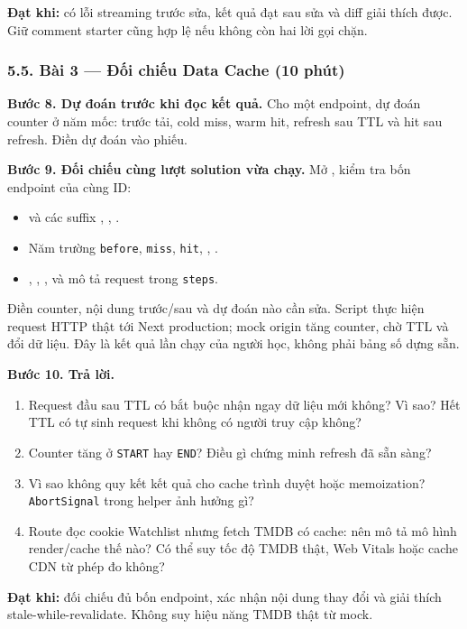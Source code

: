 \documentclass[12pt,a4paper]{extarticle}
\begin{document}
\textbf{Đạt khi:} có lỗi streaming trước sửa, kết quả đạt sau sửa và diff giải thích được. Giữ comment starter cũng hợp lệ nếu không còn hai lời gọi chặn.

\subsubsection*{5.5. Bài 3 — Đối chiếu Data Cache (10 phút)}
\textbf{Bước 8. Dự đoán trước khi đọc kết quả.} Cho một endpoint, dự đoán counter ở năm mốc: trước tải, cold miss, warm hit, refresh sau TTL và hit sau refresh. Điền dự đoán vào phiếu.

\textbf{Bước 9. Đối chiếu cùng lượt solution vừa chạy.} Mở , kiểm tra bốn endpoint của cùng ID:
\begin{itemize}[noitemsep]
    \item {} và các suffix , , .
    \item Năm trường \texttt{before}, \texttt{miss}, \texttt{hit}, , .
    \item {}, , ,  và mô tả request trong \texttt{steps}.
\end{itemize}
Điền counter, nội dung trước/sau và dự đoán nào cần sửa. Script thực hiện request HTTP thật tới Next production; mock origin tăng counter, chờ TTL và đổi dữ liệu. Đây là kết quả lần chạy của người học, không phải bảng số dựng sẵn.

\textbf{Bước 10. Trả lời.}
\begin{enumerate}[noitemsep]
    \item Request đầu sau TTL có bắt buộc nhận ngay dữ liệu mới không? Vì sao? Hết TTL có tự sinh request khi không có người truy cập không?
    \item Counter tăng ở \texttt{START} hay \texttt{END}? Điều gì chứng minh refresh đã sẵn sàng?
    \item Vì sao không quy kết kết quả cho cache trình duyệt hoặc memoization? \texttt{AbortSignal} trong helper ảnh hưởng gì?
    \item Route đọc cookie Watchlist nhưng fetch TMDB có cache: nên mô tả mô hình render/cache thế nào? Có thể suy tốc độ TMDB thật, Web Vitals hoặc cache CDN từ phép đo không?
\end{enumerate}
\textbf{Đạt khi:} đối chiếu đủ bốn endpoint, xác nhận nội dung thay đổi và giải thích stale-while-revalidate. Không suy hiệu năng TMDB thật từ mock.
\end{document}
